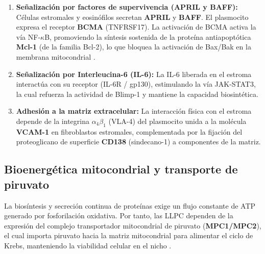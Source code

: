 \begin{enumerate}
	\item \textbf{Señalización por factores de supervivencia (APRIL y BAFF):} Células estromales y eosinófilos secretan \textbf{APRIL} y \textbf{BAFF}. El plasmocito expresa el receptor \textbf{BCMA} (TNFRSF17). La activación de BCMA activa la vía NF-$\kappa$B, promoviendo la síntesis sostenida de la proteína antiapoptótica \textbf{Mcl-1} (de la familia Bcl-2), lo que bloquea la activación de Bax/Bak en la membrana mitocondrial \parencite{tellier2019plasma}.
	\item \textbf{Señalización por Interleucina-6 (IL-6):} La IL-6 liberada en el estroma interactúa con su receptor (IL-6R / gp130), estimulando la vía JAK-STAT3, la cual refuerza la actividad de Blimp-1 y mantiene la capacidad biosintética.
	\item \textbf{Adhesión a la matriz extracelular:} La interacción física con el estroma depende de la integrina $\alpha_4\beta_1$ (VLA-4) del plasmocito unida a la molécula \textbf{VCAM-1} en fibroblastos estromales, complementada por la fijación del proteoglicano de superficie \textbf{CD138} (sindecano-1) a componentes de la matriz.
\end{enumerate}

\subsection{Bioenergética mitocondrial y transporte de piruvato}
La biosíntesis y secreción continua de proteínas exige un flujo constante de ATP generado por fosforilación oxidativa. Por tanto, las LLPC dependen de la expresión del complejo transportador mitocondrial de piruvato (\textbf{MPC1/MPC2}), el cual importa piruvato hacia la matriz mitocondrial para alimentar el ciclo de Krebs, manteniendo la viabilidad celular en el nicho \parencite{lam2018metabolic}.


